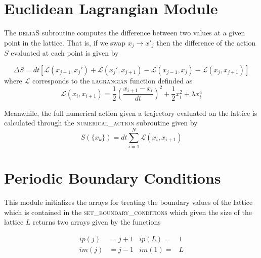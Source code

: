 \section{Euclidean Lagrangian Module}

The \textsc{deltaS} subroutine computes the difference between two values at a given point in the lattice. That is, if we swap $x_j \rightarrow x'_j$ then the difference of the action $S$ evaluated at each point  is given by 

\begin{equation}
    \Delta S = dt\left[ \mathcal{L }(x_{j-1}, x_{j}') + \mathcal{L }(x_{j}', x_{j+1}) - \mathcal{L}(x_{j-1}, x_j)-\mathcal{L}(x_j, x_{j+1})\right]
\end{equation}
where $\mathcal{L}$ corresponds to the \textsc{lagrangian} function definded as
\begin{equation}
    \mathcal{L}(x_{i}, x_{i+1}) = \frac{1}{2}\left(\frac{x_{i+1}-x_i}{dt}\right)^2 + \frac{1}{2}x_i^2  + \lambda x_i^4
\end{equation}

Meanwhile, the full numerical action given a trajectory evaluated on the lattice is calculated through the \textsc{numerical\_action} subroutine given by
\begin{equation}
    S(\{x_k\})=dt\sum_{i=1}^N \mathcal{L}(x_{i}, x_{i+1})
\end{equation}

\section{Periodic Boundary Conditions}

This module initializes the arrays for treating the boundary values of the lattice which is contained in the \textsc{set\_boundary\_conditions} which given the size of the lattice $L$ returns two arrays given by the functions 

\begin{align}
     ip(j) &= j + 1  &  ip(L)=&1\\
    im(j) &= j - 1  &  im(1)=&L
\end{align}


